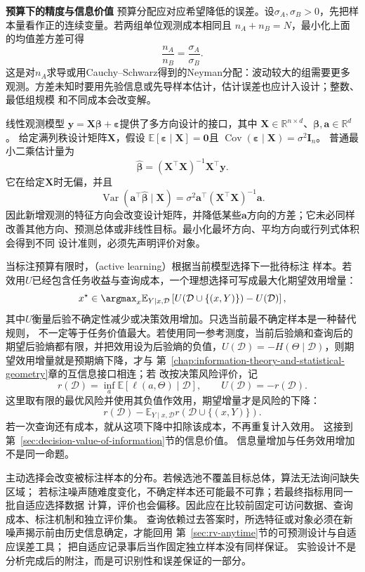 \par\medskip\noindent\textbf{预算下的精度与信息价值}\quad
预算分配应对应希望降低的误差。设\(\sigma_A,\sigma_B>0\)，先把样本量看作正的连续变量。若两组单位观测成本相同且
\(n_A+n_B=N\)，最小化上面的均值差方差可得
\[
  \frac{n_A}{n_B}=\frac{\sigma_A}{\sigma_B}.
\]
这是对\(n_A\)求导或用Cauchy--Schwarz得到的Neyman分配：波动较大的组需要更多
观测。方差未知时要用先验信息或先导样本估计，估计误差也应计入设计；整数、最低组规模
和不同成本会改变解。

线性观测模型
\(\bm y=\bm X\bm\beta+\bm\varepsilon\)提供了多方向设计的接口，其中
\(\bm X\in\mathbb{R}^{n\times d}\)、\(\bm\beta,\bm a\in\mathbb{R}^d\)。
给定满列秩设计矩阵\(\bm X\)，假设
\(\mathbb{E}[\bm\varepsilon\mid\bm X]=\bm{0}\)且
\(\operatorname{Cov}(\bm\varepsilon\mid\bm X)=\sigma^2\bm I_n\)。
普通最小二乘估计量为
\[
  \widehat{\bm\beta}
  =(\bm X^\top\bm X)^{-1}\bm X^\top\bm y.
\]
它在给定\(\bm X\)时无偏，并且
\[
  \operatorname{Var}(\bm a^\top\widehat{\bm\beta}\mid\bm X)
  =\sigma^2\bm a^\top(\bm X^\top\bm X)^{-1}\bm a.
\]
因此新增观测的特征方向会改变设计矩阵，并降低某些\(\bm a\)方向的方差；它未必同样
改善其他方向、预测总体或非线性目标。最小化最坏方向、平均方向或行列式体积会得到不同
设计准则，必须先声明评价对象。

当标注预算有限时，（active learning）根据当前模型选择下一批待标注
样本。若效用\(U\)已经包含任务收益与查询成本，一个理想选择可写成最大化期望效用增量：
\[
  x^\star\in\argmax_x
  \mathbb{E}_{Y\mid x,\mathcal D}
  \left[
    U(\mathcal D\cup\{(x,Y)\})-U(\mathcal D)
  \right],
\]
其中\(U\)衡量后验不确定性减少或决策效用增加。只选当前最不确定样本是一种替代规则，
不一定等于任务价值最大。若使用同一参考测度，当前后验熵和查询后的期望后验熵都有限，并把效用设为后验熵的负值，\(U(\mathcal D)=-H(\Theta\mid\mathcal D)\)，则期望效用增量就是预期熵下降，才与
第~\ref{chap:information-theory-and-statistical-geometry}章的互信息接口相连；若
改按决策风险评价，记
\[
 r(\mathcal D)=\inf_a\mathbb E[\ell(a,\Theta)\mid\mathcal D],
 \qquad U(\mathcal D)=-r(\mathcal D).
\]
这里取有限的最优风险并使用其负值作效用，期望增量才是风险的下降：
\[
 r(\mathcal D)-
 \mathbb E_{Y\mid x,\mathcal D}r(\mathcal D\cup\{(x,Y)\}).
\]
若一次查询还有成本，就从这项下降中扣除该成本，不再重复计入效用。
这接到第~\ref{sec:decision-value-of-information}节的信息价值。
信息量增加与任务效用增加不是同一命题。

主动选择会改变被标注样本的分布。若候选池不覆盖目标总体，算法无法询问缺失区域；
若标注噪声随难度变化，不确定样本还可能最不可靠；若最终指标用同一批自适应选择数据
计算，评价也会偏移。因此应在比较前固定可访问数据、查询成本、标注机制和独立评价集。
查询依赖过去答案时，所选特征或对象必须在新噪声揭示前由历史信息确定，才能回用
第~\ref{sec:rv-anytime}节的可预测设计与自适应误差工具；
把自适应记录事后当作固定独立样本没有同样保证。
实验设计不是分析完成后的附注，而是可识别性和误差保证的一部分。

